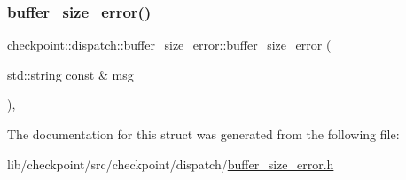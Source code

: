 \subsubsection{\texorpdfstring{buffer\+\_\+size\+\_\+error()}{buffer\_size\_error()}}
{\footnotesize\ttfamily checkpoint\+::dispatch\+::buffer\+\_\+size\+\_\+error\+::buffer\+\_\+size\+\_\+error (\begin{DoxyParamCaption}\item[{std\+::string const \&}]{msg }\end{DoxyParamCaption})\hspace{0.3cm}{\ttfamily [inline]}, {\ttfamily [explicit]}}



The documentation for this struct was generated from the following file\+:\begin{DoxyCompactItemize}
\item 
lib/checkpoint/src/checkpoint/dispatch/\hyperlink{buffer__size__error_8h}{buffer\+\_\+size\+\_\+error.\+h}\end{DoxyCompactItemize}
